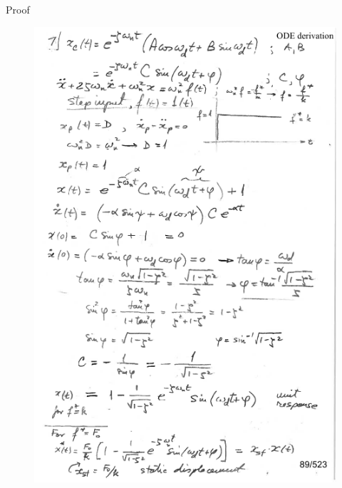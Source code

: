 \documentclass[12pt,letter]{article}
\numberwithin{ex}{section} %
\numberwithin{re}{section} %
\newcommand{\gr}[1]{\textcolor[rgb]{0.00,0.50,0.00}{#1}}
\numberwithin{equation}{section}	%
\begin{document}
\begin{mdframed}[middlelinewidth=0.5mm]
	\begin{center}
		\gr{Proof}
	\end{center}

\begin{figure}[H]
	\centering
	\includegraphics[width=5.5in]{../figures/x_t_time_response_2nd_order_step_proof_1}
\end{figure}
\begin{figure}[H]
	\centering

\end{figure}
\end{mdframed}
\end{document}
